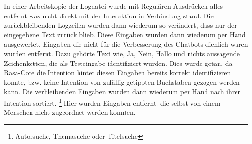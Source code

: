 \documentclass[12pt,a4paper]{article}
\begin{document}
In einer Arbeitskopie der Logdatei wurde mit Regulären Ausdrücken alles entfernt was nicht direkt mit der Interaktion in Verbindung stand.
Die zurückbleibenden Logzeilen wurden dann wiederum so verändert, dass nur der eingegebene Text zurück blieb.
Diese Eingaben wurden dann wiederum per Hand ausgewertet.
Eingaben die nicht für die Verbesserung des Chatbots dienlich waren wurden entfernt.
Dazu gehörte Text wie, {\glqq}Ja{\grqq}, {\glqq}Nein{\grqq}, {\glqq}Hallo{\grqq} und nichts aussagende Zeichenketten, die als Testeingabe identifiziert wurden.
Dies wurde getan, da Rasa-Core die Intention hinter diesen Eingaben bereits korrekt identifizieren konnte, bzw. keine Intention von zufällig getippten Buchstaben gezogen werden kann.
Die verbleibenden Eingaben wurden dann wiederum per Hand nach ihrer Intention sortiert.%
\footnote{Autorsuche, Themasuche oder Titelsuche}
Hier wurden Eingaben entfernt, die selbst von einem Menschen nicht zugeordnet werden konnten.


{}

\end{document}
